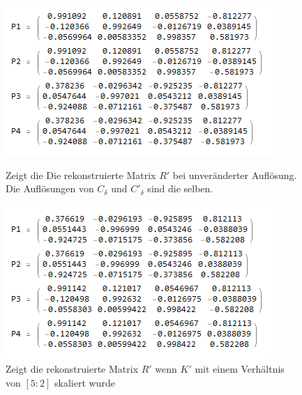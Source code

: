 \begin{figure}[!htb]
	\includegraphics[width=\linewidth]{images/R_11.png}
	\caption{Zeigt die Die rekonstruierte Matrix $R'$ bei unveränderter Auflösung. Die Auflösungen von $C_\delta$ und $C'_\delta$ sind die selben.}
	\label{fig:awesome_image1}
	\endminipage\hfill
	\includegraphics[width=\linewidth]{images/R_52.png}
	\caption{Zeigt die rekonstruierte Matrix $R'$ wenn $K'$ mit einem Verhältnis von $[5:2]$ skaliert wurde}
	\label{fig:awesome_image2}
	\endminipage\hfill
\end{figure}

